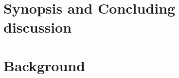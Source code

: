 



\maketitle%

\tableofcontents{}

\setcounter{chapter}{-1}
\chapter{Synopsis and Concluding discussion}
\clearpage

\clearpage



\chapter{Background}\label{chapter:stringdiagrams}

\clearpage
\label{sec:proctheory}





